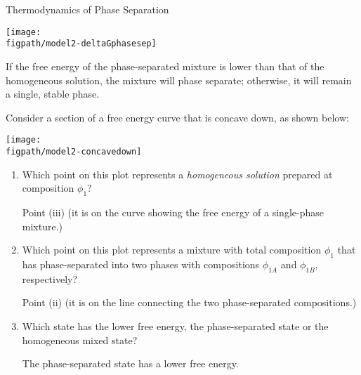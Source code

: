 \begin{activity}{Thermodynamics of Phase Separation}
\begin{model}
		\vspace{0.1in}
		\centerline{\texttt{[image: \\figpath/model2-deltaGphasesep]}}
	
	If the free energy of the phase-separated mixture is lower than that of the homogeneous solution, the mixture will phase separate; otherwise, it will remain a single, stable phase.

\end{model}

		\vspace{0.1in}
\begin{ctqs}
		\question Consider a section of a free energy curve that is concave down, as shown below:
	
		\vspace{0.1in}
		\centerline{\texttt{[image: \\figpath/model2-concavedown]}}

			\begin{enumerate}
				\item Which point on this plot represents a \emph{homogeneous solution} prepared at composition $\phi_1$?
					
					\begin{solution}[0.75in]
					
						Point (iii) (it is on the curve showing the free energy of a single-phase mixture.)
					
					\end{solution}
					
				\item Which point on this plot represents a mixture with total composition $\phi_1$ that has phase-separated into two phases with compositions $\phi_{1A}$ and $\phi_{1B}$, respectively?
					
					\begin{solution}[0.75in]
					
						Point (ii) (it is on the line connecting the two phase-separated compositions.)
						
					\end{solution}
					
				\item Which state has the lower free energy, the phase-separated state or the homogeneous mixed state?
					
					\begin{solution}[0.75in]
					
						The phase-separated state has a lower free energy.
					
					\end{solution}
					

\end{enumerate}
\end{ctqs}
\end{activity}
